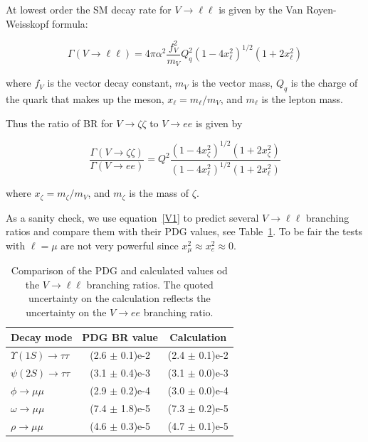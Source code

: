 \documentclass[12pt]{article}
\begin{document}
  At lowest order the SM decay rate for $V \to \ell \ell$ is given
  by the Van Royen-Weisskopf formula\cite{VR1,VR2}:

  \begin{equation}
    \Gamma(V \to \ell \ell) = 4 \pi \alpha^2 \frac{f_V^2}{m_V} Q_q^2
    (1-4x_\ell^2)^{1/2} (1+2x_\ell^2)
    \end{equation}

  \noindent where $f_V$ is the vector decay constant, $m_V$ is the
  vector mass, $Q_q$ is the charge of the quark that makes up the meson,
  $x_\ell = m_\ell/m_V$, and $m_\ell$ is the lepton mass.

  \noindent Thus the ratio of BR for $V \to \zeta \zeta$ to $V \to ee$ is
  given by

  \begin{equation} 
    \frac{\Gamma(V \to \zeta \zeta)}{\Gamma(V \to ee)} = Q^2
    \frac{(1-4x_\zeta^2)^{1/2} (1+2x_\zeta^2)}{(1-4x_\ell^2)^{1/2} (1+2x_\ell^2)}
    \label{V1}
    \end{equation}

  \noindent where $x_\zeta = m_\zeta/m_V$, and $m_\zeta$ is the mass of $\zeta$.
  
  As a sanity check, we use equation~\ref{V1} to predict several $V \to \ell \ell$
  branching ratios and compare them with their PDG values, see Table~\ref{tab:VBR}.
  To be fair the tests with $\ell = \mu$ are not very powerful since
  $x_{\mu}^2 \approx x_{e}^2 \approx 0$.

  \begin{table}
    \begin{center}
      \begin{tabular}{|l|c|c|}
        \hline
        Decay mode & PDG BR value & Calculation \\
        \hline
        $\Upsilon(1S) \to \tau \tau$  & (2.6 $\pm$ 0.1)e-2 & (2.4 $\pm$ 0.1)e-2 \\
        $\psi(2S) \to \tau \tau$  & (3.1 $\pm$ 0.4)e-3 & (3.1 $\pm$ 0.0)e-3 \\
        $\phi \to \mu \mu$       & (2.9 $\pm$ 0.2)e-4  & (3.0 $\pm$ 0.0)e-4 \\  
        $\omega \to \mu \mu$ & (7.4 $\pm$ 1.8)e-5  & (7.3 $\pm$ 0.2)e-5 \\  
        $\rho \to \mu \mu$      & (4.6 $\pm$ 0.3)e-5  &  (4.7 $\pm$ 0.1)e-5 \\  
        \hline
      \end{tabular}
      \caption{Comparison of the PDG and calculated values od the $V \to \ell \ell$
        branching ratios.  The quoted uncertainty on the calculation reflects the uncertainty
        on the $V \to ee$ branching ratio.}
      \label{tab:VBR}
    \end{center}
  \end{table}
\end{document}
